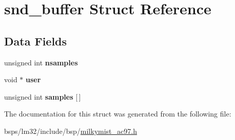 \hypertarget{structsnd__buffer}{}\section{snd\+\_\+buffer Struct Reference}
\label{structsnd__buffer}
\subsection*{Data Fields}
\begin{DoxyCompactItemize}
\item 
\mbox{\label{structsnd__buffer_a9145cde7598241cf5b10515dd0a6cd1a}} 
unsigned int {\bfseries nsamples}
\item 
\mbox{\label{structsnd__buffer_a94a8192f930d8a14fa202b69c24cf03a}} 
void $\ast$ {\bfseries user}
\item 
\mbox{\label{structsnd__buffer_a16ce53f6ac52073b48fc33be18ab266b}} 
unsigned int {\bfseries samples} \mbox{[}$\,$\mbox{]}
\end{DoxyCompactItemize}


The documentation for this struct was generated from the following file\+:\begin{DoxyCompactItemize}
\item 
bsps/lm32/include/bsp/\mbox{\hyperlink{milkymist__ac97_8h}{milkymist\+\_\+ac97.\+h}}\end{DoxyCompactItemize}

